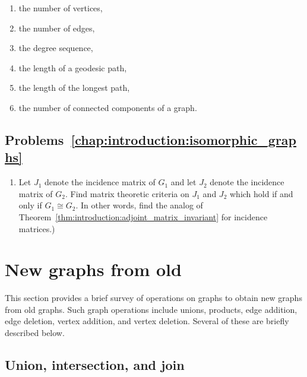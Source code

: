 \begin{enumerate}
\item the number of vertices,

\item the number of edges,

\item the degree sequence,

\item the length of a geodesic path,

\item the length of the longest path,

\item the number of connected components of a graph.
\end{enumerate}



\subsection*{Problems~\ref{chap:introduction:isomorphic_graphs}}

\begin{enumerate}
\item Let $J_1$ denote the incidence matrix of $G_1$ and let $J_2$
  denote the incidence matrix of $G_2$. Find matrix theoretic criteria
  on $J_1$ and $J_2$ which hold if and only if $G_1 \cong G_2$. In
  other words, find the analog of
  Theorem~\ref{thm:introduction:adjoint_matrix_invariant} for
  incidence matrices.)
\end{enumerate}



\section{New graphs from old}
\label{sec:new_graphs_from_old}

This section provides a brief survey of operations on graphs to obtain
new graphs from old graphs. Such graph operations include unions,
products, edge addition, edge deletion, vertex addition, and vertex
deletion. Several of these are briefly described below.



\subsection{Union, intersection, and join}

